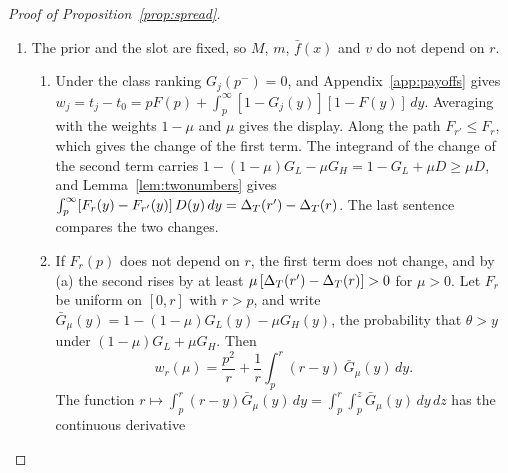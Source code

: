 \begin{proof}[Proof of Proposition~\ref{prop:spread}]
\begin{enumerate}[label=(\roman*),leftmargin=2em]
Let \(\pi\ge1/2\), \(\rho\le1/2\), and let an indifferent high-cost rival prepare. Then \(\bar f(1)\ge\bar f(-1)\),
and \eqref{eq:a8-balance} gives \(M-\pi\le\pi-m\). Take the rows of the table in (iii).
\begin{itemize}[leftmargin=2em]
\item \(\pi<\tau\le M\), entry \((\rho,\rho,1)\). The formula with \(e(1)=1\) and \(w_F(M)=w_L+\DT M\) gives
\(I_+-I_-=(1-\rho)\,w_L+\DT\,(M-2\rho\pi+\rho m)\). Since \(\rho\le1/2\), \(M-2\rho\pi\ge M-\pi>0\), and \(w_L\ge0\), so
\(I_+>I_-\).
\item \(M<\tau\), entry \((\rho,\rho,\rho)\). The formula gives \(I_+-I_-=\rho\DT\,[(M-\pi)-(\pi-m)]\le0\).
\item \(\tau\le m\), entry \((1,1,1)\). Then \(I_+=\DT\,(M-\pi)\) and \(I_-=\DT\,(\pi-m)\), so \(I_+\le I_-\).
\item \(m<\tau\le\pi\), entry \((\rho,1,1)\). Then \(I_+=\DT\,(M-\pi)\) and
\(I_-=w_F(\pi)-\rho\,w_F(m)=\rho\DT\,(\pi-m)+(1-\rho)\,w_F(\pi)\). Hence
\(I_+-I_-\le(1-\rho)\,\DT\,(\pi-m)-(1-\rho)\,w_F(\pi)<0\), because \(w_F(\pi)\ge\DT\pi>\DT\,(\pi-m)\).
\end{itemize}
So \(I_+>I_-\) exactly in the row \(\pi<\tau\le M\), the only row in which \(e(1)>e(0)\).
\item The prior and the slot are fixed, so \(M\), \(m\), \(\bar f(x)\) and \(v\) do not depend on \(r\).
\begin{enumerate}[label=(\alph*),leftmargin=2em]
\item Under the class ranking \(G_j(p^-)=0\), and Appendix~\ref{app:payoffs} gives
\(w_j=t_j-t_0=pF(p)+\int_p^\infty[1-G_j(y)][1-F(y)]\,dy\). Averaging with the weights \(1-\mu\) and \(\mu\) gives the
display. Along the path \(F_{r'}\le F_r\), which gives the change of the first term. The integrand of the change of the
second term carries \(1-(1-\mu)G_L-\mu G_H=1-G_L+\mu D\ge\mu D\), and Lemma~\ref{lem:twonumbers} gives
\(\int_p^\infty[F_r(y)-F_{r'}(y)]\,D(y)\,dy=\Delta_T(r')-\Delta_T(r)\). The last sentence compares the two changes.
\item If \(F_r(p)\) does not depend on \(r\), the first term does not change, and by (a) the second rises by at least
\(\mu\,[\Delta_T(r')-\Delta_T(r)]>0\) for \(\mu>0\). Let \(F_r\) be uniform on \([0,r]\) with \(r>p\), and write
\(\bar G_\mu(y)=1-(1-\mu)G_L(y)-\mu G_H(y)\), the probability that \(\theta>y\) under \((1-\mu)G_L+\mu G_H\). Then
\[
w_r(\mu)=\frac{p^2}{r}+\frac1r\int_p^r(r-y)\,\bar G_\mu(y)\,dy .
\]
The function \(r\mapsto\int_p^r(r-y)\bar G_\mu(y)\,dy=\int_p^r\int_p^z\bar G_\mu(y)\,dy\,dz\) has the continuous derivative

\end{enumerate}
\end{enumerate}
\end{proof}
